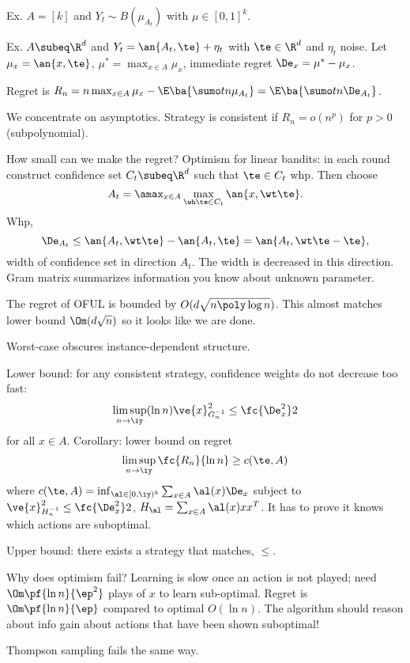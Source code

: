 Ex. $A=[k]$ and $Y_t\sim B(\mu_{A_t})$ with $\mu\in [0,1]^k$. 

Ex. $A\subeq \R^d$ and $Y_t=\an{A_t,\te}+\eta_t$ with $\te\in \R^d$ and $\eta_t$ noise. Let $\mu_x=\an{x,\te}$, $\mu^*=\max_{x\in A}\mu_x$, immediate regret $\De_x=\mu^*-\mu_x$.

Regret is $R_n= n\max_{x\in A} \mu_x - \E\ba{\sumo tn \mu_{A_t}} = 
\E\ba{\sumo tn\De_{A_t}}$. 

We concentrate on asymptotics. Strategy is consistent if $R_n=o(n^p)$ for $p>0$ (subpolynomial). 

How small can we make the regret?  Optimism for linear bandits: in each round construct confidence set $C_t\subeq \R^d$ such that $\te\in C_t$ whp. Then choose 
$$
A_t = \amax_{x\in A} \max_{\wh \te\in C_t}\an{x,\wt\te}.
$$
Whp, 
$$
\De_{A_t}\le\an{A_t,\wt \te} - \an{A_t, \te} = 
 \an{A_t, \wt \te - \te},
$$
width of confidence set in direction $A_t$.
The width is decreased in this direction.
Gram matrix summarizes information you know about unknown parameter. %

The regret of OFUL is bounded by $O(d\sqrt{n\poly\log n})$. This almost matches lower bound $\Om(d\sqrt n)$ so it looks like we are done. 

Worst-case obscures instance-dependent structure.

Lower bound: for any consistent strategy, confidence weights do not decrease too fast:
$$
\limsup_{n\to \iy}( \ln n) \ve{x}_{G_n^{-1}}^2 \le \fc{\De_x^2}2
$$
for all $x\in A$. Corollary: lower bound on regret $$\limsup_{n\to \iy} \fc{R_n}{\ln n} \ge c(\te, A)$$ 
where $c(\te, A) = \inf_{\al \in [0,\iy)^k} \sum_{x\in A} \al(x) \De_x$ subject to $\ve{x}_{H_n^{-1}}^2 \le \fc{\De_x^2}2$, $H_\al = \sum_{x\in A} \al(x) xx^T$.
It has to prove it knows which actions are suboptimal.

Upper bound: there exists a strategy that matches, $\le$. 

Why does optimism fail? 
Learning is slow once an action is not played; need $\Om\pf{\ln n}{\ep^2}$ plays of $x$ to learn sub-optimal. Regret is $\Om\pf{\ln n}{\ep}$ compared to optimal $O(\ln n)$. The algorithm should reason about info gain about actions that have been shown suboptimal!

Thompson sampling fails the same way. 


